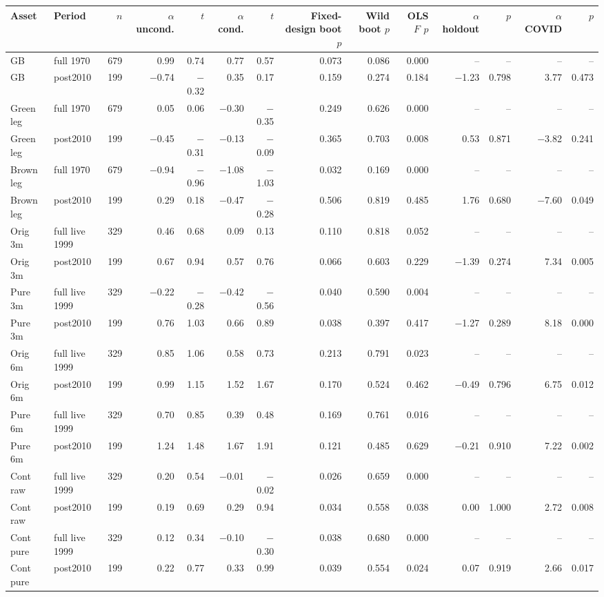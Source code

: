 \begin{tabular}{llrrrrrrrrrrrr}
\toprule
Asset & Period & $n$ & $\alpha$ uncond. & $t$ & $\alpha$ cond. & $t$ & Fixed-design boot $p$ & Wild boot $p$ & OLS $F$ $p$ & $\alpha$ holdout & $p$ & $\alpha$ COVID & $p$ \\
\midrule
GB & full 1970 & 679 & 0.99 & 0.74 & 0.77 & 0.57 & 0.073 & 0.086 & 0.000 & -- & -- & -- & -- \\
GB & post2010 & 199 & $-$0.74 & $-$0.32 & 0.35 & 0.17 & 0.159 & 0.274 & 0.184 & $-$1.23 & 0.798 & 3.77 & 0.473 \\
Green leg & full 1970 & 679 & 0.05 & 0.06 & $-$0.30 & $-$0.35 & 0.249 & 0.626 & 0.000 & -- & -- & -- & -- \\
Green leg & post2010 & 199 & $-$0.45 & $-$0.31 & $-$0.13 & $-$0.09 & 0.365 & 0.703 & 0.008 & 0.53 & 0.871 & $-$3.82 & 0.241 \\
Brown leg & full 1970 & 679 & $-$0.94 & $-$0.96 & $-$1.08 & $-$1.03 & 0.032 & 0.169 & 0.000 & -- & -- & -- & -- \\
Brown leg & post2010 & 199 & 0.29 & 0.18 & $-$0.47 & $-$0.28 & 0.506 & 0.819 & 0.485 & 1.76 & 0.680 & $-$7.60 & 0.049 \\
Orig 3m & full live 1999 & 329 & 0.46 & 0.68 & 0.09 & 0.13 & 0.110 & 0.818 & 0.052 & -- & -- & -- & -- \\
Orig 3m & post2010 & 199 & 0.67 & 0.94 & 0.57 & 0.76 & 0.066 & 0.603 & 0.229 & $-$1.39 & 0.274 & 7.34 & 0.005 \\
Pure 3m & full live 1999 & 329 & $-$0.22 & $-$0.28 & $-$0.42 & $-$0.56 & 0.040 & 0.590 & 0.004 & -- & -- & -- & -- \\
Pure 3m & post2010 & 199 & 0.76 & 1.03 & 0.66 & 0.89 & 0.038 & 0.397 & 0.417 & $-$1.27 & 0.289 & 8.18 & 0.000 \\
Orig 6m & full live 1999 & 329 & 0.85 & 1.06 & 0.58 & 0.73 & 0.213 & 0.791 & 0.023 & -- & -- & -- & -- \\
Orig 6m & post2010 & 199 & 0.99 & 1.15 & 1.52 & 1.67 & 0.170 & 0.524 & 0.462 & $-$0.49 & 0.796 & 6.75 & 0.012 \\
Pure 6m & full live 1999 & 329 & 0.70 & 0.85 & 0.39 & 0.48 & 0.169 & 0.761 & 0.016 & -- & -- & -- & -- \\
Pure 6m & post2010 & 199 & 1.24 & 1.48 & 1.67 & 1.91 & 0.121 & 0.485 & 0.629 & $-$0.21 & 0.910 & 7.22 & 0.002 \\
Cont raw & full live 1999 & 329 & 0.20 & 0.54 & $-$0.01 & $-$0.02 & 0.026 & 0.659 & 0.000 & -- & -- & -- & -- \\
Cont raw & post2010 & 199 & 0.19 & 0.69 & 0.29 & 0.94 & 0.034 & 0.558 & 0.038 & 0.00 & 1.000 & 2.72 & 0.008 \\
Cont pure & full live 1999 & 329 & 0.12 & 0.34 & $-$0.10 & $-$0.30 & 0.038 & 0.680 & 0.000 & -- & -- & -- & -- \\
Cont pure & post2010 & 199 & 0.22 & 0.77 & 0.33 & 0.99 & 0.039 & 0.554 & 0.024 & 0.07 & 0.919 & 2.66 & 0.017 \\
\bottomrule
\end{tabular}
